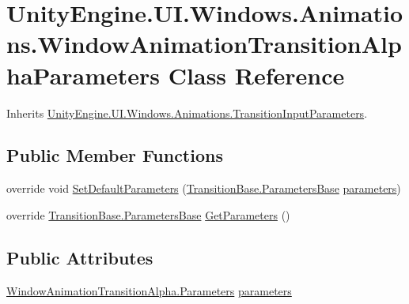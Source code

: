 \hypertarget{class_unity_engine_1_1_u_i_1_1_windows_1_1_animations_1_1_window_animation_transition_alpha_parameters}{}\section{Unity\+Engine.\+U\+I.\+Windows.\+Animations.\+Window\+Animation\+Transition\+Alpha\+Parameters Class Reference}
\label{class_unity_engine_1_1_u_i_1_1_windows_1_1_animations_1_1_window_animation_transition_alpha_parameters}


Inherits \hyperlink{class_unity_engine_1_1_u_i_1_1_windows_1_1_animations_1_1_transition_input_parameters}{Unity\+Engine.\+U\+I.\+Windows.\+Animations.\+Transition\+Input\+Parameters}.

\subsection*{Public Member Functions}
\begin{DoxyCompactItemize}
\item 
override void \hyperlink{class_unity_engine_1_1_u_i_1_1_windows_1_1_animations_1_1_window_animation_transition_alpha_parameters_afc04940daae80e32a4cdb4a62800caa9}{Set\+Default\+Parameters} (\hyperlink{class_unity_engine_1_1_u_i_1_1_windows_1_1_animations_1_1_transition_base_1_1_parameters_base}{Transition\+Base.\+Parameters\+Base} \hyperlink{class_unity_engine_1_1_u_i_1_1_windows_1_1_animations_1_1_window_animation_transition_alpha_parameters_a88df6729500ddf3fd04775efe3d4fb86}{parameters})
\item 
override \hyperlink{class_unity_engine_1_1_u_i_1_1_windows_1_1_animations_1_1_transition_base_1_1_parameters_base}{Transition\+Base.\+Parameters\+Base} \hyperlink{class_unity_engine_1_1_u_i_1_1_windows_1_1_animations_1_1_window_animation_transition_alpha_parameters_ac2d55f961ce0fd35147a81bbb11ab308}{Get\+Parameters} ()
\end{DoxyCompactItemize}
\subsection*{Public Attributes}
\begin{DoxyCompactItemize}
\item 
\hyperlink{class_unity_engine_1_1_u_i_1_1_windows_1_1_animations_1_1_window_animation_transition_alpha_1_1_parameters}{Window\+Animation\+Transition\+Alpha.\+Parameters} \hyperlink{class_unity_engine_1_1_u_i_1_1_windows_1_1_animations_1_1_window_animation_transition_alpha_parameters_a88df6729500ddf3fd04775efe3d4fb86}{parameters}
\end{DoxyCompactItemize}


